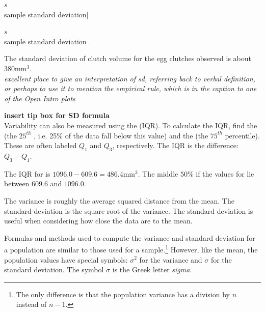 \begin{doublespace}
$s$\\\footnotesize sample standard deviation]{\raggedright\vspace{-10mm}
	
	$s$\\\footnotesize sample standard deviation
}The standard deviation of clutch volume for the egg clutches observed is about $380 \textrm{mm}^{3}$.  \\

\textit{excellent place to give an interpretation of sd, referring back to verbal definition, or perhaps to use it to mention the empirical rule, which is in the caption to one of the Open Intro plots}

\textbf{insert tip box for SD formula}\\

Variability can also be measured using the  (IQR).  To calculate the IQR, find the   (the $25^{th}$ , i.e. 25\% of the data fall below this value) and the   (the $75^{th}$ percentile). These are often labeled $Q_1$  and $Q_3$, respectively. The IQR is the difference: $Q_3 - Q_1$.

The IQR for  is $1096.0 - 609.6 = 486.4\textrm{mm}^{3}$.  The middle $50\%$ if the values for  lie between $609.6$ and $1096.0$.


\begin{termBox}{
		The variance is roughly the average squared distance from the mean. The standard deviation is the square root of the variance. The standard deviation is useful when considering how close the data are to the mean.}
\end{termBox}

Formulas and methods used to compute the variance and standard deviation for a population are similar to those used for a sample.\footnote{The only difference is that the population variance has a division by $n$ instead of $n-1$.} However, like the mean, the population values have special symbols: $\sigma_{}^2$ for the variance and $\sigma$ for the standard deviation. The symbol $\sigma$  is the Greek letter \emph{sigma}.


\end{doublespace}
